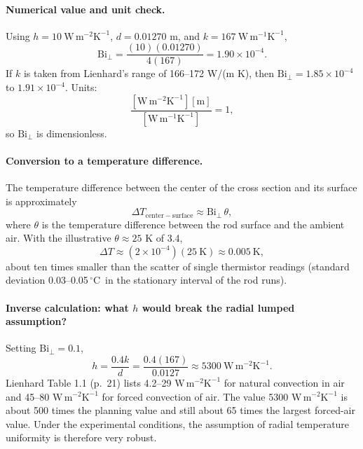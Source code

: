 \documentclass[reprint, amsmath, amssymb, aps, prl]{revtex4-2}
\newcommand{\degC}{\ensuremath{\,^\circ\mathrm{C}}}
\newcommand{\Biperp}{\mathrm{Bi}_\perp}
\newcommand{\WmK}{\mathrm{W\,m^{-1}K^{-1}}}
\newcommand{\WmmK}{\mathrm{W\,m^{-2}K^{-1}}}
\begin{document}
\paragraph*{Numerical value and unit check.}
Using $h=10~\WmmK$, $d=0.01270$ m, and $k=167~\WmK$,
\begin{equation*}
\Biperp=\frac{(10)(0.01270)}{4(167)}=1.90\times10^{-4}.
\end{equation*}
If $k$ is taken from Lienhard's range of 166--172 W/(m K), then
$\Biperp=1.85\times10^{-4}$ to $1.91\times10^{-4}$. Units:
\begin{equation*}
\frac{[\WmmK][\mathrm{m}]}{[\WmK]}=1,
\end{equation*}
so $\Biperp$ is dimensionless.

\paragraph*{Conversion to a temperature difference.}
The temperature difference between the center of the cross section and its surface is
approximately
\begin{equation*}
\Delta T_{\mathrm{center-surface}}\approx\Biperp\,\theta,
\end{equation*}
where $\theta$ is the temperature difference between the rod surface and the ambient air.
With the illustrative $\theta\approx25$ K of 3.4,
\begin{equation*}
\Delta T\approx(2\times10^{-4})(25~\mathrm{K})\approx0.005~\mathrm{K},
\end{equation*}
about ten times smaller than the scatter of single thermistor readings (standard deviation
0.03--0.05\degC\ in the stationary interval of the rod runs).

\paragraph*{Inverse calculation: what $h$ would break the radial lumped assumption?}
Setting $\Biperp=0.1$,
\begin{equation*}
h=\frac{0.4k}{d}=\frac{0.4(167)}{0.0127}\approx5300~\WmmK.
\end{equation*}
Lienhard Table 1.1 (p.~21) lists 4.2--29 $\WmmK$ for natural convection in air and
45--80 $\WmmK$ for forced convection of air. The value 5300 $\WmmK$ is about 500 times the
planning value and still about 65 times the largest forced-air value. Under the
experimental conditions, the assumption of radial temperature uniformity is therefore
very robust.
\end{document}
